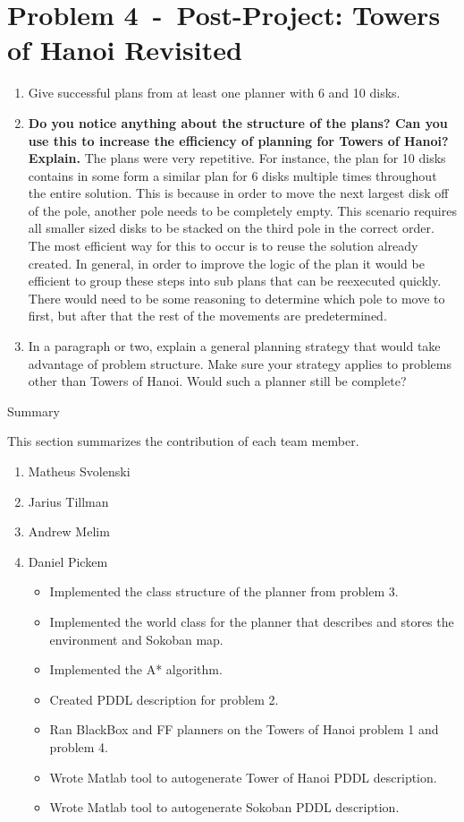 \documentclass[12pt]{article}
\newcommand{\problem}[2]{\section*{Problem {#1}~-~{#2}}}
\begin{document}
\problem{4}{Post-Project: Towers of Hanoi Revisited}
\label{sec:problem_4}
\begin{enumerate}
 \item Give successful plans from at least one planner with 6 and 10 disks.
 \item \textbf{Do you notice anything about the structure of the plans? Can you use this to increase the
efficiency of planning for Towers of Hanoi? Explain.}
   The plans were very repetitive. For instance, the plan for 10 disks contains in some form a similar plan for 6 disks multiple times throughout the entire solution. This is because in order to move the next largest disk off of the pole, another pole needs to be completely empty. This scenario requires all smaller sized disks to be stacked on the third pole in the correct order. The most efficient way for this to occur is to reuse the solution already created. In general, in order to improve the logic of the plan it would be efficient to group these steps into sub plans that can be reexecuted quickly. There would need to be some reasoning to determine which pole to move to first, but after that the rest of the movements are predetermined. 
 \item In a paragraph or two, explain a general planning strategy that would take advantage of
problem structure. Make sure your strategy applies to problems other than Towers of Hanoi.
Would such a planner still be complete?
\end{enumerate}

\newpage
\begin{center}
\Huge{Summary} 
\end{center}
This section summarizes the contribution of each team member. 

\begin{enumerate}
  \item Matheus Svolenski
  \item Jarius Tillman
  \item Andrew Melim
  \item Daniel Pickem
    \begin{itemize}
     \item Implemented the class structure of the planner from problem 3.
     \item Implemented the world class for the planner that describes and stores the environment and Sokoban map.
     \item Implemented the A* algorithm.
     \item Created PDDL description for problem 2.
     \item Ran BlackBox and FF planners on the Towers of Hanoi problem 1 and problem 4.
     \item Wrote Matlab tool to autogenerate Tower of Hanoi PDDL description.
     \item Wrote Matlab tool to autogenerate Sokoban PDDL description.
    \end{itemize}
\end{enumerate}
\end{document}
